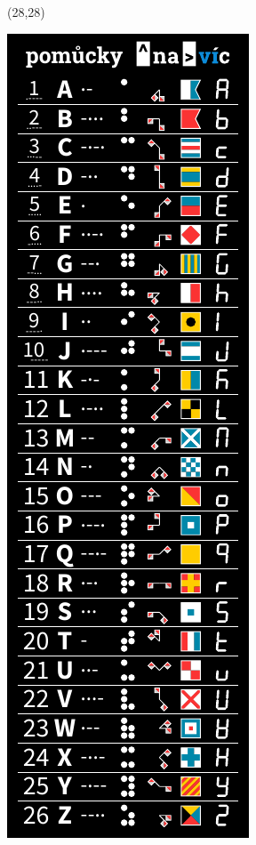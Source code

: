 \documentclass{extarticle}
\begin{document}
\pagestyle{empty}


\begin{textblock}{42}(28,28)
\vfill
{\centerline{\includegraphics[scale=1,]{tools-front.pdf}}} 
\vfill
\end{textblock}
\end{document}
